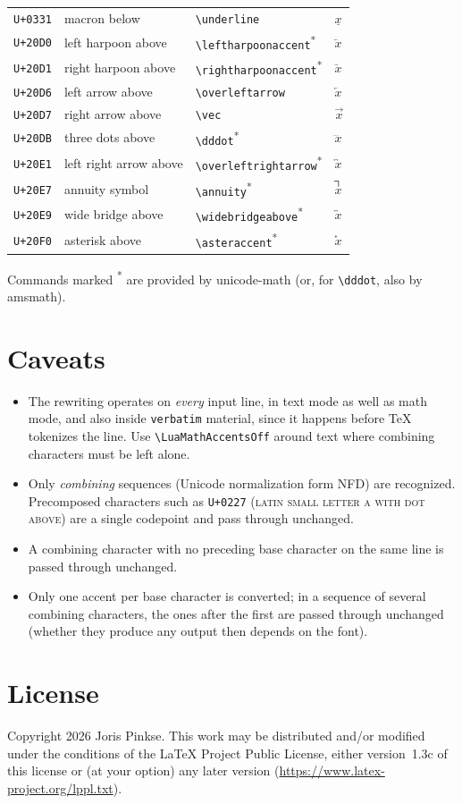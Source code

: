 \documentclass{article}
\begin{document}
\begin{longtable}{llll}
\texttt{U+0331} & macron below & \verb|\underline| & $\underline{x}$\\
\texttt{U+20D0} & left harpoon above & \verb|\leftharpoonaccent|\textsuperscript{*} & $\leftharpoonaccent{x}$\\
\texttt{U+20D1} & right harpoon above & \verb|\rightharpoonaccent|\textsuperscript{*} & $\rightharpoonaccent{x}$\\
\texttt{U+20D6} & left arrow above & \verb|\overleftarrow| & $\overleftarrow{x}$\\
\texttt{U+20D7} & right arrow above & \verb|\vec| & $\vec{x}$\\
\texttt{U+20DB} & three dots above & \verb|\dddot|\textsuperscript{*} & $\dddot{x}$\\
\texttt{U+20E1} & left right arrow above & \verb|\overleftrightarrow|\textsuperscript{*} & $\overleftrightarrow{x}$\\
\texttt{U+20E7} & annuity symbol & \verb|\annuity|\textsuperscript{*} & $\annuity{x}$\\
\texttt{U+20E9} & wide bridge above & \verb|\widebridgeabove|\textsuperscript{*} & $\widebridgeabove{x}$\\
\texttt{U+20F0} & asterisk above & \verb|\asteraccent|\textsuperscript{*} & $\asteraccent{x}$\\
\bottomrule
\end{longtable}

\noindent
Commands marked \textsuperscript{*} are provided by
\textsf{unicode-math} (or, for \verb|\dddot|, also by
\textsf{amsmath}).

\section{Caveats}

\begin{itemize}
  \item The rewriting operates on \emph{every} input line, in text
    mode as well as math mode, and also inside \texttt{verbatim}
    material, since it happens before TeX tokenizes the line.  Use
    \verb|\LuaMathAccentsOff| around text where combining characters must
    be left alone.
  \item Only \emph{combining} sequences (Unicode normalization form
    NFD) are recognized.  Precomposed characters such as
    \texttt{U+0227} (\textsc{latin small letter a with dot above}) are
    a single codepoint and pass through unchanged.
  \item A combining character with no preceding base character on the
    same line is passed through unchanged.
  \item Only one accent per base character is converted; in a sequence
    of several combining characters, the ones after the first are
    passed through unchanged (whether they produce any output then
    depends on the font).
\end{itemize}

\section{License}

Copyright 2026 Joris Pinkse.  This work may be distributed and/or
modified under the conditions of the \LaTeX{} Project Public License,
either version~1.3c of this license or (at your option) any later
version (\url{https://www.latex-project.org/lppl.txt}).
\end{document}
